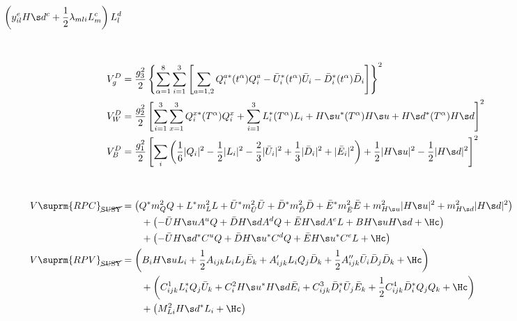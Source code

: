 \begin{align}
\left(y^e_{il}\Hd^c+\frac12\lambda_{mli}L_m^c\right)L_l^d
\\[30pt]
 V^D_g &= \frac{g_3^2}2\left\{
 \sum_{\alpha=1}^8\sum_{i=1}^3\left[
  \sum_{a=1,2}Q_i^{a*}(t^\alpha)Q_i^{a}
- \bU_i^{*}(t^\alpha)\bU_i
- \bD_i^{*}(t^\alpha)\bD_i
\right]\right\}^2\\
%
 V^D_W &= \frac{g_2^2}2
 \left[
  \sum_{i=1}^3\sum_{x=1}^3 Q_i^{x*}(T^\alpha)Q_i^{x}
+ \sum_{i=1}^3 L_i^{*}(T^\alpha) L_i
+ \Hu^{*}(T^\alpha)\Hu
+ \Hd^{*}(T^\alpha)\Hd
\right]^2\\
%
 V^D_B &= \frac{g_1^2}2\left[
  \sum_i\left(\frac16|  Q_i |^2
- \frac12|  L_i |^2
- \frac23|\bU_i |^2
+ \frac13|\bD_i |^2
+        |\bE_i |^2\right)
+ \frac12|\Hu   |^2
- \frac12|\Hd   |^2
\right]^2
\\[30pt]
 V\suprm{RPC}_{\text{\cancel{SUSY}}}&=
\left(Q^*m_Q^2Q+L^*m_L^2L+\bU^* m_\bU^2\bU + \bD^* m_\bD^2\bD + \bE^* m_\bE^2\bE
       +m^2_{\Hu}|\Hu|^2 + m^2_{\Hd}|\Hd|^2\right)
\notag\\&\qquad
+\left(-\bU \Hu A^uQ + \bD\Hd A^dQ+\bE \Hd A^e L + B\Hu\Hd+\Hc\right)
\\&\qquad
+\left(-\bU \Hd^*C^u Q+\bD \Hu^*C^dQ+\bE\Hu^*C^eL+\Hc\right)
\notag\\
V\suprm{RPV}_{\text{\cancel{SUSY}}}&=
 \left(B_i\Hu L_i + \frac12A_{ijk}L_iL_j\bE_k+A'_{ijk}L_iQ_j\bD_k
       +\frac12A''_{ijk}\bU_i\bD_j\bD_k+\Hc\right) 
\\&\qquad + \left(C^1_{ijk}L_i^*Q_j\bU_k + C^2_i\Hu^*\Hd\bE_i + C^3_{ijk}\bD^*_i\bU_j\bE_k+\frac12C^4_{ijk}\bD^*_iQ_jQ_k+\Hc\right)
\notag\\&\qquad + \left(M^2_{Li}\Hd^*L_i+\Hc\right)\notag
\end{align}



